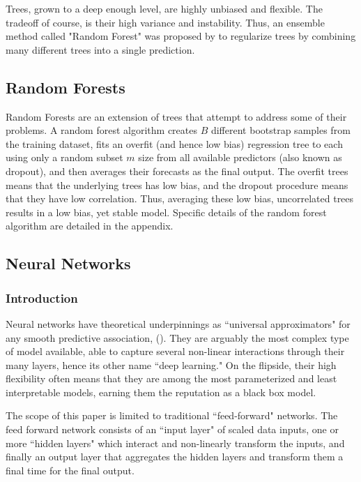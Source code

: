\documentclass[a4paper, table]{article}
\begin{document}
Trees, grown to a deep enough level, are highly unbiased and flexible. The tradeoff of course, is their high variance and instability. Thus, an ensemble method called "Random Forest" was proposed by \cite{breiman_random_2001} to regularize trees by combining many different trees into a single prediction.

\subsection{Random Forests}
Random Forests are an extension of trees that attempt to address some of their problems. A random forest algorithm creates $B$ different bootstrap samples from the training dataset, fits an overfit (and hence low bias) regression tree to each using only a random subset $m$ size from all available predictors (also known as dropout), and then averages their forecasts as the final output. The overfit trees means that the underlying trees has low bias, and the dropout procedure means that they have low correlation. Thus, averaging these low bias, uncorrelated trees results in a low bias, yet stable model. Specific details of the random forest algorithm are detailed in the appendix.

\pagebreak

\subsection{Neural Networks}

\subsubsection{Introduction}

Neural networks have theoretical underpinnings as ``universal approximators" for any smooth predictive association, (\cite{hornik_multilayer_1989}). They are arguably the most complex type of model available, able to capture several non-linear interactions through their many layers, hence its other name ``deep learning."  On the flipside, their high flexibility often means that they are among the most parameterized and least interpretable models, earning them the reputation as a black box model.

The scope of this paper is limited to traditional ``feed-forward" networks. The feed forward network consists of an ``input layer" of scaled data inputs, one or more ``hidden layers" which interact and non-linearly transform the inputs, and finally an output layer that aggregates the hidden layers and transform them a final time for the final output. 
\end{document}
